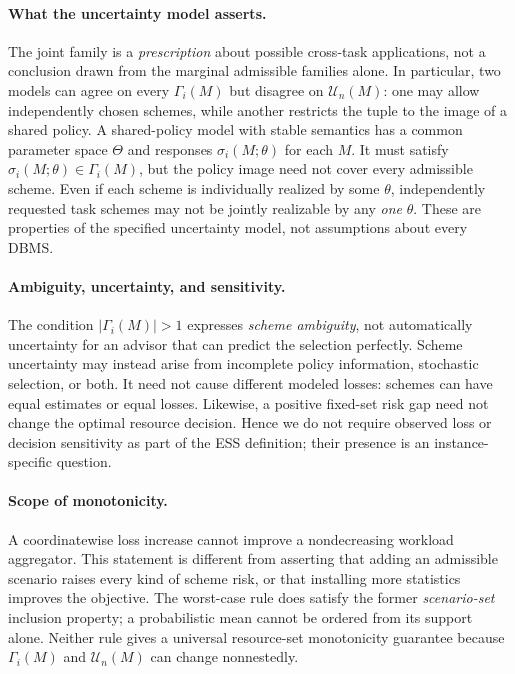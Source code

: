 \documentclass[sigconf, nonacm]{acmart}
\begin{document}
\paragraph{What the uncertainty model asserts.}
The joint family is a \emph{prescription} about possible
cross-task applications, not a conclusion drawn from the
marginal admissible families alone. In particular, two
models can agree on every $\Gamma_i(M)$ but disagree on
$\mathcal U_n(M)$: one may allow independently chosen
schemes, while another restricts the tuple to the image
of a shared policy. A shared-policy model with stable
semantics has a common parameter space $\Theta$ and
responses $\sigma_i(M;\theta)$ for each $M$. It must
satisfy $\sigma_i(M;\theta)\in\Gamma_i(M)$, but the
policy image need not cover every admissible scheme.
Even if each scheme is individually realized by
some $\theta$, independently requested task schemes
may not be jointly realizable by any \emph{one} $\theta$.
These are properties of the specified uncertainty model,
not assumptions about every DBMS.

\paragraph{Ambiguity, uncertainty, and sensitivity.}
The condition $|\Gamma_i(M)|>1$ expresses
\emph{scheme ambiguity}, not automatically
uncertainty for an advisor that can predict the
selection perfectly. Scheme uncertainty may instead
arise from incomplete policy information, stochastic
selection, or both. It need not cause different
modeled losses: schemes can have equal estimates or
equal losses. Likewise, a positive fixed-set risk gap
need not change the optimal resource decision. Hence
we do not require observed loss or decision sensitivity
as part of the ESS definition; their presence is an
instance-specific question.

\paragraph{Scope of monotonicity.}
A coordinatewise loss increase cannot improve a
nondecreasing workload aggregator. This statement is
different from asserting that adding an admissible
scenario raises every kind of scheme risk, or that
installing more statistics improves the objective.
The worst-case rule does satisfy the former
\emph{scenario-set} inclusion property; a probabilistic
mean cannot be ordered from its support alone.
Neither rule gives a universal resource-set
monotonicity guarantee because $\Gamma_i(M)$ and
$\mathcal U_n(M)$ can change nonnestedly.
\end{document}
